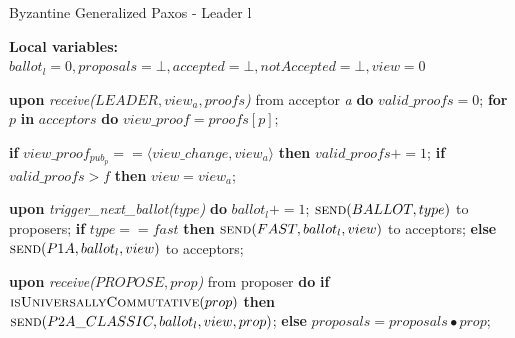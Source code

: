 \begin{algorithm} 
	\caption{Byzantine Generalized Paxos - Leader l}
	\label{BFT-Lead}
	\textbf{Local variables:} $ballot_l = 0,proposals = \bot, accepted = \bot, notAccepted = \bot, view = 0$
	\begin{algorithmic}[1]
		\State \textbf{upon} \textit{receive($LEADER,view_a,proofs$)} from acceptor \textit{a} \textbf{do}
		\State \hspace{\algorithmicindent} $valid\_proofs = 0$;
		\State \hspace{\algorithmicindent} \textbf{for} $p$ \textbf{in} $acceptors$ \textbf{do} 
		\State \hspace{\algorithmicindent}\hspace{\algorithmicindent} $view\_proof = proofs[p]$;
		
		\State \hspace{\algorithmicindent}\hspace{\algorithmicindent} \textbf{if} $view\_proof_{pub_p} == \langle view\_change, view_a \rangle$ \textbf{then}
		\State \hspace{\algorithmicindent}\hspace{\algorithmicindent}\hspace{\algorithmicindent}  $valid\_proofs \mathrel{+{=}} 1$;
		\State \hspace{\algorithmicindent} \textbf{if} $valid\_proofs > f$ \textbf{then}
		\State \hspace{\algorithmicindent}\hspace{\algorithmicindent} $view = view_a$;
		
		\State
		\State \textbf{upon} \textit{trigger\_next\_ballot($type$)} \textbf{do}
		\State \hspace{\algorithmicindent} $ballot_l \mathrel{+{=}} 1$;
		\State \hspace{\algorithmicindent} $\Call{send}{BALLOT,type}$ to proposers;
		\State \hspace{\algorithmicindent} \textbf{if} $type == fast$ \textbf{then}
		\State \hspace{\algorithmicindent}\hspace{\algorithmicindent} $\Call{send}{FAST,ballot_l,view}$ to acceptors;
		\State \hspace{\algorithmicindent} \textbf{else}
		\State \hspace{\algorithmicindent}\hspace{\algorithmicindent} $\Call{send}{P1A, ballot_l, view}$ to acceptors;
		
		\State
		\State \textbf{upon} \textit{receive($PROPOSE, prop$)} from proposer \textbf{do} 
		\State \hspace{\algorithmicindent} \textbf{if} $\Call{isUniversallyCommutative}{prop}$ \textbf{then}
		\State \hspace{\algorithmicindent}\hspace{\algorithmicindent} $\Call{send}{P2A\_CLASSIC, ballot_l,view, prop}$;
		\State \hspace{\algorithmicindent} \textbf{else}
		\State \hspace{\algorithmicindent}\hspace{\algorithmicindent} $proposals = proposals \bullet prop$;
		

\end{algorithmic}
\end{algorithm}
